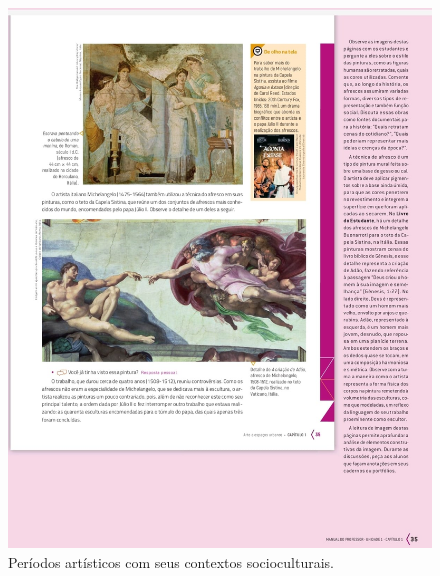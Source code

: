 \documentclass[portuguese]{textolivre}
\begin{document}
\begin{figure}[h!]
\begin{minipage}{.9\textwidth}
\begin{minipage}{0.45\textwidth}
 \includegraphics[width=\textwidth]{Imagem6.jpeg}
 \caption{Períodos artísticos com seus contextos socioculturais.}
 \label{fig6}
 \end{minipage}%
 \end{minipage}
\end{figure}


\end{document}
